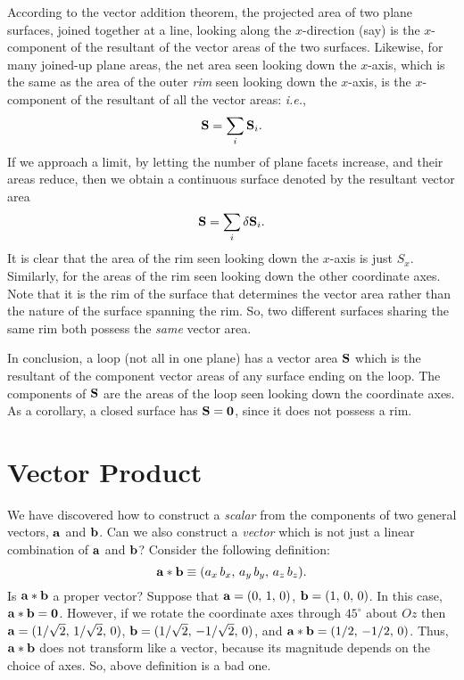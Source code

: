 According to the vector addition theorem, the projected area of two plane surfaces,
joined together at a line, 
looking along the $x$-direction (say) is the $x$-component of the resultant of the vector areas of the two surfaces.
Likewise, for many joined-up plane areas, the net area seen looking down the $x$-axis,
which is the same as the  area of the outer {\em rim}\/ seen looking down the $x$-axis, is the
$x$-component  of the resultant of all the vector areas: {\em i.e.}, 
\begin{equation}
{\bf S} = \sum_i {\bf S}_i.
\end{equation}
If we approach a limit,
by letting the number of plane facets increase, and their areas reduce, then we
obtain a continuous surface denoted by the resultant vector area
\begin{equation}
 {\bf S} = \sum_i \delta  {\bf S}_i.
\end{equation}
It is
clear that the area of the rim seen looking down the $x$-axis is just $S_x$. Similarly, for the areas
of the rim seen looking down the other coordinate axes. 
Note that it is the rim of the surface that determines the vector area rather than the nature of
the surface spanning the rim. So, two different surfaces sharing the same rim both possess the {\em same}\/
vector area. 

In conclusion, a loop (not all in one plane) has a vector area ${\bf S}$ which
is the resultant of the component vector areas of any surface ending on the loop. The
components  of ${\bf S}$ are the areas of the loop seen looking down the coordinate axes. As a corollary, a closed surface has ${\bf S} = {\bf 0}$,
since it does not possess a rim. 


\section{Vector Product}\label{svecp}
We have discovered how to construct a {\em scalar}\/ from the components of two
general vectors, $\bf a$ and $\bf b$. Can we also construct a {\em vector}\/ which is not
just a linear combination of $\bf a$ and $\bf b$? Consider the following definition:
\begin{equation}
{\bf a} \ast{\bf b} \equiv (a_x \,b_x,\, a_y\, b_y,\, a_z \,b_z).
\end{equation}
Is ${\bf a} \ast {\bf b}$ a proper vector? Suppose  that ${\bf a} =
(0,\,1,\,0)$, ${\bf b} = (1,\,0,\,0)$. In this case,  ${\bf a} \ast {\bf b}= {\bf 0}$.
However, if we rotate the coordinate axes through $45^\circ$ about $Oz$ then
${\bf a} = (1/\sqrt{2},\, 1/\sqrt{2},\, 0)$, ${\bf b} = (1/\sqrt{2},\, -1/\sqrt{2},\,0)$,
and ${\bf a}\ast {\bf b} = (1/2,\, -1/2,\,0)$. Thus, ${\bf a}\ast {\bf b}$ does
not transform like a vector, because its magnitude depends on the choice of axes.
So, above definition is a bad one.

